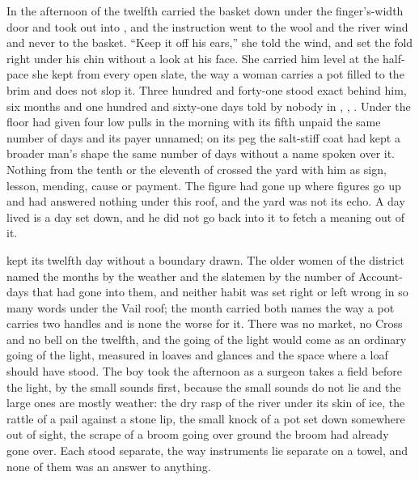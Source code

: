 In the afternoon of the twelfth  carried the basket down under the finger's-width door and took  out into , and the instruction went to the wool and the river wind and never to the basket. “Keep it off his ears,” she told the wind, and set the fold right under his chin without a look at his face. She carried him level at the half-pace she kept from every open slate, the way a woman carries a pot filled to the brim and does not slop it. Three hundred and forty-one stood exact behind him, six months and one hundred and sixty-one days told by nobody in , , . Under the floor  had given four low pulls in the morning with its fifth unpaid the same number of days and its payer unnamed; on its peg the salt-stiff coat had kept a broader man's shape the same number of days without a name spoken over it. Nothing from the tenth or the eleventh of  crossed the yard with him as sign, lesson, mending, cause or payment. The figure had gone up where figures go up and had answered nothing under this roof, and the yard was not its echo. A day lived is a day set down, and he did not go back into it to fetch a meaning out of it.

 kept its twelfth day without a boundary drawn. The older women of the district named the months by the weather and the slatemen by the number of Account-days that had gone into them, and neither habit was set right or left wrong in so many words under the Vail roof; the month carried both names the way a pot carries two handles and is none the worse for it. There was no market, no Cross and no bell on the twelfth, and the going of the light would come as an ordinary going of the light, measured in loaves and glances and the space where a loaf should have stood. The boy took the afternoon as a surgeon takes a field before the light, by the small sounds first, because the small sounds do not lie and the large ones are mostly weather: the dry rasp of the river under its skin of ice, the rattle of a pail against a stone lip, the small knock of a pot set down somewhere out of sight, the scrape of a broom going over ground the broom had already gone over. Each stood separate, the way instruments lie separate on a towel, and none of them was an answer to anything.

